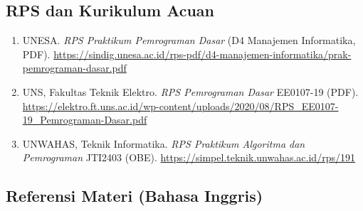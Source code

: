 \documentclass[12pt,a4paper]{article}
\begin{document}
\subsection*{RPS dan Kurikulum Acuan}

\begin{enumerate}[leftmargin=*]
  \item UNESA. \textit{RPS Praktikum Pemrograman Dasar} (D4 Manajemen Informatika, PDF). \url{https://sindig.unesa.ac.id/rps-pdf/d4-manajemen-informatika/prak-pemrograman-dasar.pdf}

  \item UNS, Fakultas Teknik Elektro. \textit{RPS Pemrograman Dasar} EE0107-19 (PDF). \url{https://elektro.ft.uns.ac.id/wp-content/uploads/2020/08/RPS_EE0107-19_Pemrograman-Dasar.pdf}

  \item UNWAHAS, Teknik Informatika. \textit{RPS Praktikum Algoritma dan Pemrograman} JTI2403 (OBE). \url{https://simpel.teknik.unwahas.ac.id/rps/191}
\end{enumerate}

\subsection*{Referensi Materi (Bahasa Inggris)}
\end{document}
